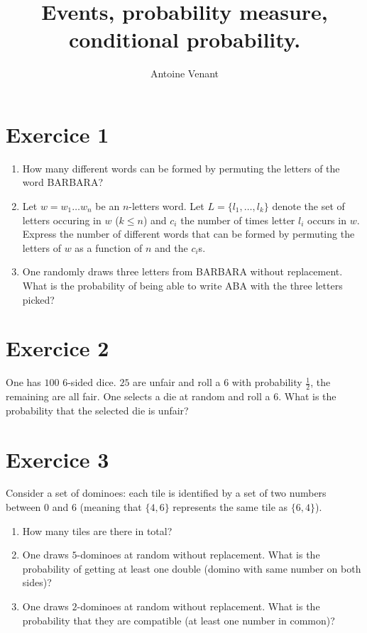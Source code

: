 \documentclass{article}
\title{Events, probability measure, conditional probability.}
\author{Antoine Venant}
\begin{document}
\maketitle


\section*{Exercice 1}

\begin{enumerate}
\item How many different words can be formed by permuting the letters of the word {\sc BARBARA}?
\item Let $w = w_1 \dots w_n$ be an $n$-letters word. Let $L = \{l_1, \dots, l_k\}$ denote the set of letters occuring in $w$ ($k \le n$) and $c_i$ the number of times letter $l_i$ occurs in $w$. Express the number of different words that can be formed by permuting the letters of $w$ as a function of $n$ and the $c_i$s.
\item One randomly draws three letters from {\sc BARBARA} without replacement. What is the probability of being able to write {\sc ABA} with the three letters picked? 
\end{enumerate}


\section*{Exercice 2}
One has $100$ $6$-sided dice. $25$ are unfair and roll a $6$ with probability $\frac{1}{2}$, the remaining are all fair. One selects a die at random and roll a $6$. What is the probability that the selected die is unfair?

\section*{Exercice 3}
Consider a set of dominoes: each tile is identified by a set of two numbers between $0$ and $6$ (meaning that $\{4, 6\}$ represents the same tile as $\{6, 4\}$). 
\begin{enumerate}
\item How many tiles are there in total?
\item One draws $5$-dominoes at random without replacement. What is the probability of getting at least one double (domino with same number on both sides)?
\item One draws $2$-dominoes at random without replacement. What is the probability that they are compatible (at least one number in common)?
\end{enumerate}
\end{document}
